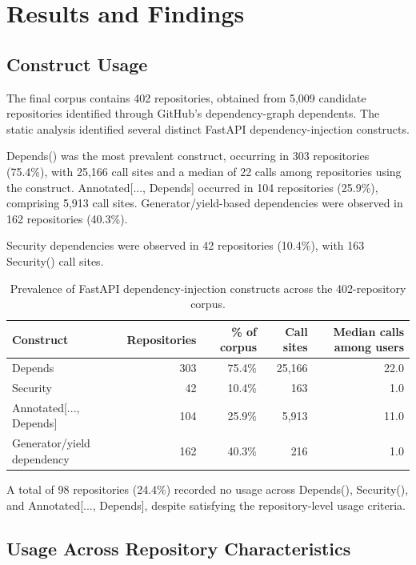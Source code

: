 \section{Results and Findings}

\subsection{Construct Usage}

The final corpus contains 402 repositories, obtained from 5,009 candidate repositories identified through GitHub's dependency-graph dependents. The static analysis identified several distinct FastAPI dependency-injection constructs.

Depends() was the most prevalent construct, occurring in 303 repositories (75.4\%), with 25,166 call sites and a median of 22 calls among repositories using the construct. Annotated[..., Depends] occurred in 104 repositories (25.9\%), comprising 5,913 call sites. Generator/yield-based dependencies were observed in 162 repositories (40.3\%).

Security dependencies were observed in 42 repositories (10.4\%), with 163 Security() call sites.

\begin{table}[!t]
\centering
\caption{Prevalence of FastAPI dependency-injection constructs across the 402-repository corpus.}
\label{tab:constructs}
\begin{tabular}{@{}lrrrr@{}}
\toprule
\textbf{Construct} & \textbf{Repositories} & \textbf{\% of corpus} & \textbf{Call sites} & \textbf{Median calls among users} \\
\midrule
Depends & 303 & 75.4\% & 25,166 & 22.0 \\
Security & 42 & 10.4\% & 163 & 1.0 \\
Annotated[..., Depends] & 104 & 25.9\% & 5,913 & 11.0 \\
Generator/yield dependency & 162 & 40.3\% & 216 & 1.0 \\
\bottomrule
\end{tabular}
\end{table}

A total of 98 repositories (24.4\%) recorded no usage across Depends(), Security(), and Annotated[..., Depends], despite satisfying the repository-level usage criteria.

\subsection{Usage Across Repository Characteristics}

